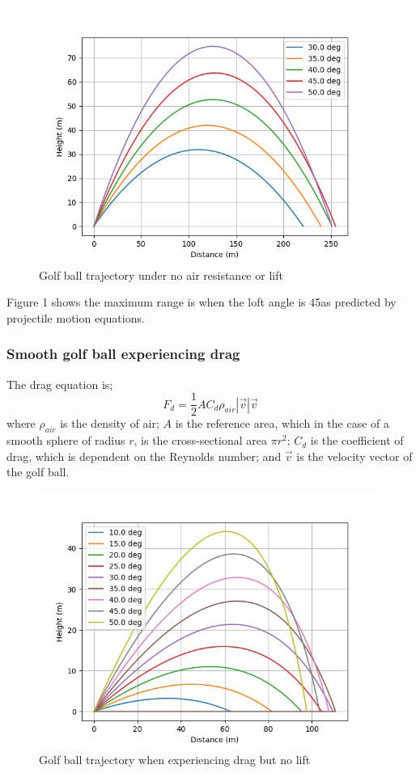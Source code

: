 \documentclass[12pt]{article}
\begin{document}
\begin{figure}[h]
\caption{Golf ball trajectory under no air resistance or lift}
\includegraphics[scale=0.8]{simple}
\end{figure}

Figure 1 shows the maximum range is when the loft angle is 45\degree as predicted by projectile motion equations.

\subsubsection{Smooth golf ball experiencing drag}
The drag equation is;
\begin{equation}
F_d = \frac{1}{2} A C_d \rho_{air} |\vec{v}| \vec{v}
\end{equation}
where $\rho_{air}$ is the density of air; $A$ is the reference area, which in the case of a smooth sphere of radius $r$, is the cross-sectional area $\pi r^2$; $C_d$ is the coefficient of drag, which is dependent on the Reynolds number; and $\vec{v}$ is the velocity vector of the golf ball.


\begin{figure}[h]
\caption{Golf ball trajectory when experiencing drag but no lift}
\includegraphics[scale=0.8]{drag}
\end{figure}
\end{document}
